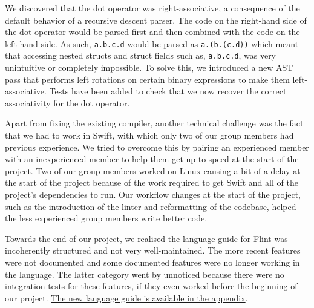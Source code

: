 \inputminted{swift}{code/events.flint}

We discovered that the dot operator was right-associative, a consequence of the default behavior of a recursive descent parser. The code on the right-hand side of the dot operator would be parsed first and then combined with the code on the left-hand side. As such, \texttt{a.b.c.d} would be parsed as \texttt{a.(b.(c.d))} which meant that accessing nested structs and struct fields such as, \texttt{a.b.c.d}, was very unintuitive or completely impossible. To solve this, we introduced a new AST pass that performs left rotations on certain binary expressions to make them left-associative. Tests have been added to check that we now recover the correct associativity for the dot operator.

Apart from fixing the existing compiler, another technical challenge was the fact that we had to work in Swift, with which only two of our group members had previous experience. We tried to overcome this by pairing an experienced member with an inexperienced member to help them get up to speed at the start of the project. Two of our group members worked on Linux causing a bit of a delay at the start of the project because of the work required to get Swift and all of the project's dependencies to run. Our workflow changes at the start of the project, such as the introduction of the linter and reformatting of the codebase, helped the less experienced group members write better code.

Towards the end of our project, we realised the \hyperref[chp:appendix-b]{language guide} for Flint was incoherently structured and not very well-maintained. The more recent features were not documented and some documented features were no longer working in the language. The latter category went by unnoticed because there were no integration tests for these features, if they even worked before the beginning of our project. \hyperref[chp:appendix-b]{The new language guide is available in the appendix}.
